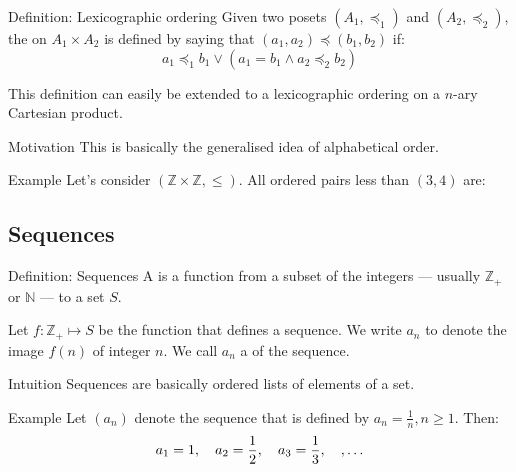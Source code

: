 \documentclass[a4paper]{article}
\begin{document}
\begin{parag}{Definition: Lexicographic ordering}
    Given two posets $\left(A_1, \preccurlyeq_1\right)$ and $\left(A_2, \preccurlyeq_2\right)$, the  on $A_1 \times A_2$ is defined by saying that $\left(a_1, a_2\right)\preccurlyeq \left(b_1, b_2\right)$ if:
    \[a_1 \preccurlyeq_1 b_1 \lor \left(a_1 = b_1 \land a_2 \preccurlyeq_2 b_2\right)\]

    This definition can easily be extended to a lexicographic ordering on a $n$-ary Cartesian product.

    \begin{subparag}{Motivation}
        This is basically the generalised idea of alphabetical order.
    \end{subparag}

    \begin{subparag}{Example}
        Let's consider $\left(\mathbb{Z} \times \mathbb{Z}, \leq\right)$. All ordered pairs less than $\left(3, 4\right)$ are:
    \end{subparag}
\end{parag}

\subsection{Sequences}
\begin{parag}{Definition: Sequences}
    A  is a function from a subset of the integers --- usually $\mathbb{Z}_+$ or $\mathbb{N}$ --- to a set $S$.

    Let $f : \mathbb{Z}_+ \mapsto S$ be the function that defines a sequence. We write $a_n$ to denote the image $f\left(n\right)$ of integer $n$. We call $a_n$ a  of the sequence.

    \begin{subparag}{Intuition}
        Sequences are basically ordered lists of elements of a set.
    \end{subparag}

    \begin{subparag}{Example}
        Let $\left(a_n\right)$ denote the sequence that is defined by $a_n = \frac{1}{n}, n \geq 1$. Then:
        \[a_1 = 1, \quad a_2 = \frac{1}{2}, \quad a_3 = \frac{1}{3}, \quad, \ldots\]
    \end{subparag}
\end{parag}
\end{document}
